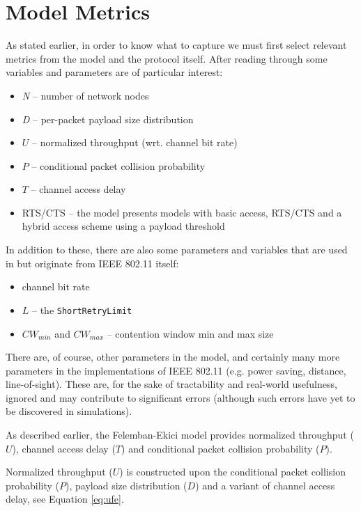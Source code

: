 \section{Model Metrics}

As stated earlier, in order to know what to capture we must first select
relevant metrics from the model and the protocol itself. After reading through
\cite{felemban} some variables and parameters are of particular interest:

\begin{itemize}
	\item \emph{N} -- number of network nodes
	\item \emph{D} -- per-packet payload size distribution
  \item $U$ -- normalized throughput (wrt. channel bit rate)
  \item $P$ -- conditional packet collision probability
  \item $T$ -- channel access delay
	\item RTS/CTS -- the model presents models with basic access, RTS/CTS and a
	hybrid access scheme using a payload threshold
\end{itemize}

In addition to these, there are also some parameters and variables that are
used in \cite{felemban} but originate from IEEE 802.11 itself:

\begin{itemize}
    \item channel bit rate
    \item $L$ -- the \texttt{ShortRetryLimit}
    \item $CW_{min}$ and $CW_{max}$ -- contention window min and max size
\end{itemize}


There are, of course, other parameters in the model, and certainly many more
parameters in the implementations of IEEE 802.11 (e.g. power saving, distance,
line-of-sight). These are, for the sake of tractability and real-world
usefulness, ignored and may contribute to significant errors (although such
errors have yet to be discovered in simulations).

As described earlier, the Felemban-Ekici model provides normalized throughput
($U$), channel access delay ($T$) and conditional packet collision probability
($P$).

Normalized throughput ($U$) is constructed upon the conditional packet
collision probability ($P$), payload size distribution ($D$) and a variant of
channel access delay, see Equation \ref{eq:ufe}.

